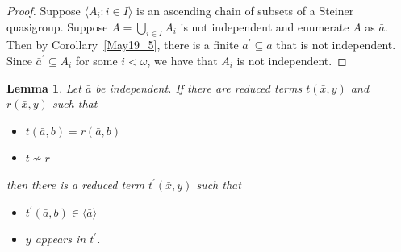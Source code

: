 \documentclass[a4paper, 11pt]{article}
\theoremstyle{note}
\newtheorem{lemma}[thm]{Lemma}
\begin{document}
	\begin{proof} Suppose $\langle A_i : i \in I \rangle$ is an ascending chain of subsets of a  Steiner quasigroup. Suppose $A=\bigcup_{i \in I} A_i$ is not independent and enumerate $A$ as $\bar{a}$. Then by Corollary~\ref{May19_5}, there is a finite $\bar{a}^\prime \subseteq \bar{a}$ that is not independent. Since $\bar{a}^\prime \subseteq A_i$ for some $i < \omega$, we have that $A_i$ is not independent.
	\end{proof}
	
	
	
	\begin{lemma}\label{May26_1} Let $\bar{a}$ be independent. If there are reduced terms $t(\bar{x},y)$ and $r(\bar{x},y)$ such that
		\begin{itemize}[topsep=0pt,itemsep=0pt]
			\item $t(\bar{a},b)=  r(\bar{a},b)$
			\item $t\not\sim r$
		\end{itemize}
		then there is a  reduced term $t^\prime(\bar{x},y)$ such that
		\begin{itemize}[topsep=0pt,itemsep=2pt]
			\item $t^\prime(\bar{a},b)\in\langle\bar{a}\rangle$
			\item $y$ appears in $t^\prime$.
		\end{itemize}
	\end{lemma}
\end{document}
